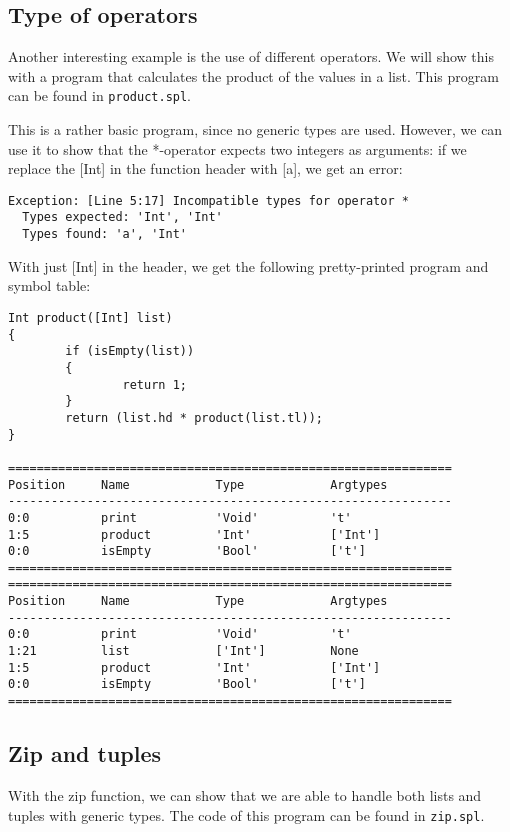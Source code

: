 \documentclass[a4paper]{article}
\begin{document}
\subsection{Type of operators}
Another interesting example is the use of different operators. We will show this with a program that calculates the product of the values in a list. This program can be found in {\tt product.spl}.

This is a rather basic program, since no generic types are used. However, we can use it to show that the *-operator expects two integers as arguments: if we replace the [Int] in the function header with [a], we get an error: 
\begin{verbatim}
Exception: [Line 5:17] Incompatible types for operator *
  Types expected: 'Int', 'Int'
  Types found: 'a', 'Int'
\end{verbatim}
With just [Int] in the header, we get the following pretty-printed program and symbol table:
\begin{verbatim}
Int product([Int] list)
{
        if (isEmpty(list))
        {
                return 1;
        }
        return (list.hd * product(list.tl));
}

==============================================================
Position     Name            Type            Argtypes            
--------------------------------------------------------------
0:0          print           'Void'          't'                 
1:5          product         'Int'           ['Int']             
0:0          isEmpty         'Bool'          ['t']               
==============================================================
==============================================================
Position     Name            Type            Argtypes            
--------------------------------------------------------------
0:0          print           'Void'          't'                 
1:21         list            ['Int']         None                
1:5          product         'Int'           ['Int']             
0:0          isEmpty         'Bool'          ['t']               
==============================================================
\end{verbatim}

\subsection{Zip and tuples}
With the zip function, we can show that we are able to handle both lists and tuples with generic types. The code of this program can be found in {\tt zip.spl}. 

\end{document}
